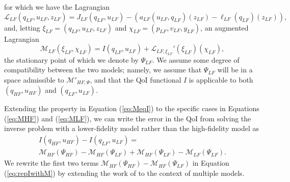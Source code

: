for which we have the Lagrangian
\begin{equation}
\mathcal{L}_{LF}(q_{LF},u_{LF},z_{LF})= J_{LF}(q_{LF},u_{LF})-(a_{LF}(u_{LF},q_{LF})(z_{LF})-\ell_{LF}(q_{LF})(z_{LF})),
\end{equation}
and, letting $\xi_{LF}=(q_{LF},u_{LF},z_{LF})$ and $\chi_{LF}=(p_{LF},v_{LF},y_{LF})$, an augmented Lagrangian 
\begin{equation}
\mathcal{M}_{LF}(\xi_{LF},\chi_{LF}) = I(q_{LF},u_{LF}) + \mathcal{L}_{LF,\xi_{LF}}'(\xi_{LF})(\chi_{LF}),
\label{eq:MLF}
\end{equation}
the stationary point of which we denote by $\Psi_{LF}$. We assume some degree of compatibility between the two models; namely, we assume that $\Psi_{LF}$ will be in a space admissible to $\mathcal{M}'_{HF,\Psi}$, and that the QoI functional $I$ is applicable to both $(q_{HF},u_{HF})$ and $(q_{LF},u_{LF})$.

Extending the property in Equation (\ref{eq:MeqI}) to the specific cases in Equations (\ref{eq:MHF}) and (\ref{eq:MLF}), we can write the error in the QoI from solving the inverse problem with a lower-fidelity model rather than the high-fidelity model as
\begin{multline}
I(q_{HF},u_{HF})-I(q_{LF},u_{LF})=\\\mathcal{M}_{HF}(\Psi_{HF})-\mathcal{M}_{HF}(\Psi_{LF})+\mathcal{M}_{HF}(\Psi_{LF})-\mathcal{M}_{LF}(\Psi_{LF})\textrm{.} 
\label{eq:repIwithM}
\end{multline}
We rewrite the first two terms $\mathcal{M}_{HF}(\Psi_{HF})-\mathcal{M}_{HF}(\Psi_{LF})$ in Equation (\ref{eq:repIwithM}) by extending the work of \cite{BecVex05} to the context of multiple models. 

